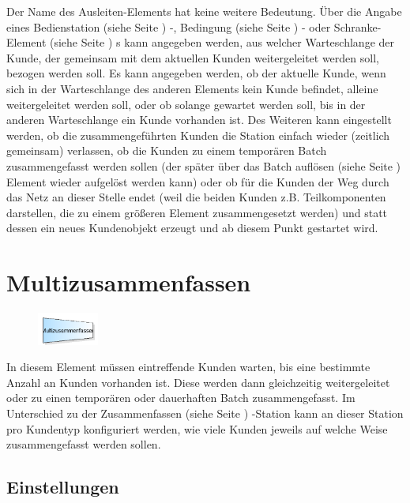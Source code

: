 Der Name des Ausleiten-Elements hat keine weitere Bedeutung. Über die Angabe eines 
Bedienstation (siehe Seite \pageref{ref:ModelElementProcess}) -, Bedingung (siehe Seite \pageref{ref:ModelElementHold}) -
oder Schranke-Element (siehe Seite \pageref{ref:ModelElementBarrier}) s kann angegeben werden, aus welcher Warteschlange
der Kunde, der gemeinsam mit dem aktuellen Kunden weitergeleitet werden soll, bezogen werden soll.
Es kann angegeben werden, ob der aktuelle Kunde, wenn sich in der Warteschlange des anderen Elements kein
Kunde befindet, alleine weitergeleitet werden soll, oder ob solange gewartet werden soll, bis in der
anderen Warteschlange ein Kunde vorhanden ist. Des Weiteren kann eingestellt werden,
ob die zusammengeführten Kunden die Station einfach wieder (zeitlich gemeinsam) verlassen, ob die Kunden zu einem temporären
Batch zusammengefasst werden sollen (der später über das Batch auflösen (siehe Seite \pageref{ref:ModelElementSeparate}) Element
wieder aufgelöst werden kann) oder ob für die Kunden der Weg durch
das Netz an dieser Stelle endet (weil die beiden Kunden z.B. Teilkomponenten darstellen, die zu einem größeren Element
zusammengesetzt werden) und statt dessen ein neues Kundenobjekt erzeugt und ab diesem Punkt gestartet wird. 


\section{Multizusammenfassen}
\label{ref:ModelElementBatchMulti}

\begin{figure}
\vspace{-22pt}
\includegraphics[width=2cm]{imageModelElementBatchMulti.png}
\vspace{-22pt}
\end{figure}

In diesem Element müssen eintreffende Kunden warten, bis eine bestimmte Anzahl an Kunden vorhanden ist.
Diese werden dann gleichzeitig weitergeleitet oder zu einen temporären oder dauerhaften Batch zusammengefasst.
Im Unterschied zu der Zusammenfassen (siehe Seite \pageref{ref:ModelElementBatch}) -Station kann an dieser Station
pro Kundentyp konfiguriert werden, wie viele Kunden jeweils auf welche Weise zusammengefasst werden sollen.

\subsection*{Einstellungen}

